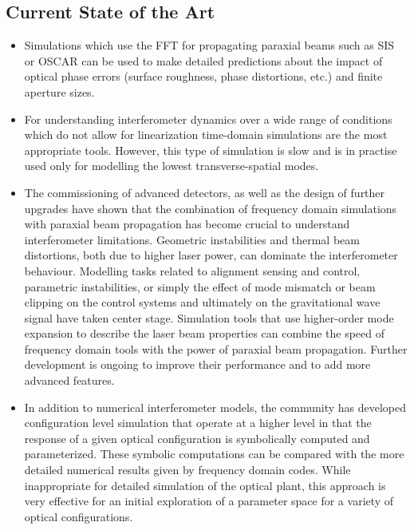 \subsection{Current State of the Art}
\begin{itemize}
\item Simulations which use the FFT for propagating paraxial beams such as
SIS or OSCAR can be used to make
detailed predictions about the impact of optical phase errors (surface
roughness, phase distortions, etc.)  and finite aperture sizes.
\item For understanding interferometer dynamics over a wide range of
conditions which do not allow for linearization time-domain
simulations are the most 
appropriate tools. However, this type of simulation is slow and
is in practise used only for modelling the lowest transverse-spatial
modes.
\item 
The commissioning of advanced detectors, as well as the design of further 
upgrades have shown that the combination of frequency domain 
simulations with paraxial beam propagation has become crucial
to understand interferometer limitations. Geometric instabilities and thermal
beam distortions, both due to higher laser power, can dominate the
interferometer behaviour. Modelling tasks related
to alignment sensing and control, parametric instabilities, or simply
the  effect of mode mismatch or beam clipping on the control systems and
ultimately on the gravitational wave signal have taken center stage.
Simulation tools that use higher-order mode
expansion to describe the laser beam properties can combine the speed
of frequency domain tools with the power of paraxial
beam propagation.  Further development is ongoing to improve their performance and to
add more advanced features.
\item In addition to numerical interferometer models, the community
  has developed configuration level simulation that operate at a
  higher level in that the response of a given optical configuration
  is symbolically computed and parameterized.
These symbolic computations can be
compared with the more detailed numerical results given by frequency
domain codes.  While inappropriate for detailed simulation of the
optical plant, this approach is very effective for an initial
exploration of a parameter space for a variety of optical configurations.  
\end{itemize}

